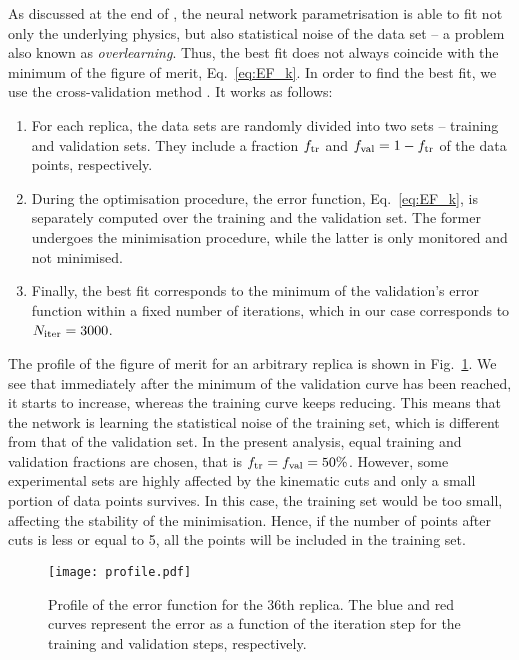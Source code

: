 As discussed at the end of , the neural network parametrisation is able to fit not only the underlying physics, but also statistical noise of the data set -- a problem also known as \textit{overlearning}. Thus, the best fit does not always coincide with the minimum of the figure of merit, Eq.~\eqref{eq:EF_k}. In order to find the best fit, we use the cross-validation method \cite{pml1Book}. It works as follows:
\begin{enumerate}
  \item For each replica, the data sets are randomly divided into two sets -- training and validation sets. They include a fraction $f_{\textrm{tr}}$ and $f_{\textrm{val}} = 1 - f_{\textrm{tr}}$ of the data points, respectively.
  \item During the optimisation procedure, the error function, Eq.~\eqref{eq:EF_k}, is separately computed over the training and the validation set. The former undergoes the minimisation procedure, while the latter is only monitored and not minimised.
  \item Finally, the best fit corresponds to the minimum of the validation's error function within a fixed number of iterations, which in our case corresponds to $N_{\textrm{iter}} = 3000$.
\end{enumerate}
The profile of the figure of merit for an arbitrary replica is shown in Fig.~\ref{fig:profile}. We see that immediately after the minimum of the validation curve has been reached, it starts to increase, whereas the training curve keeps reducing. This means that the network is learning the statistical noise of the training set, which is different from that of the validation set. In the present analysis, equal training and validation fractions are chosen, that is $f_{\textrm{tr}} = f_{\textrm{val}} = 50\%$. However, some experimental sets are highly affected by the kinematic cuts and only a small portion of data points survives. In this case, the training set would be too small, affecting the stability of the minimisation. Hence, if the number of points after cuts is less or equal to 5, all the points will be included in the training set.

\begin{figure}[t]
  \centering
  \texttt{[image: profile.pdf]} 
  \caption{\small{Profile of the error function for the 36th replica. The blue and red curves represent the error as a function of the iteration step for the training and validation steps, respectively.}}
  \label{fig:profile}
\end{figure}

